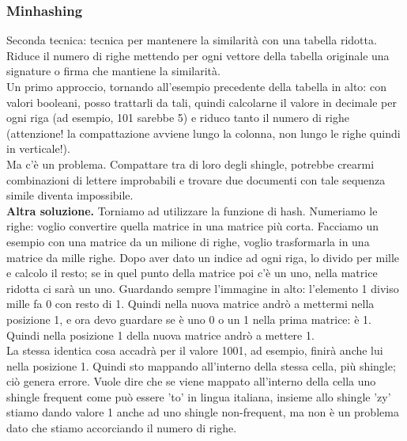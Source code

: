 \subsubsection{Minhashing}
Seconda tecnica: tecnica per mantenere la similarità con una tabella ridotta. Riduce il numero di righe mettendo per ogni vettore della tabella originale una signature o firma che mantiene la similarità. 
\\
Un primo approccio, tornando all'esempio precedente della tabella in alto: con valori booleani, posso trattarli da tali, quindi calcolarne il valore in decimale per ogni riga (ad esempio, 101 sarebbe 5) e riduco tanto il numero di righe (attenzione! la compattazione avviene lungo la colonna, non lungo le righe quindi in verticale!).
\\
Ma c'è un problema. Compattare tra di loro degli shingle, potrebbe crearmi combinazioni di lettere improbabili e trovare due documenti con tale sequenza simile diventa impossibile.
\\
\textbf{Altra soluzione.} Torniamo ad utilizzare la funzione di hash. Numeriamo le righe: voglio convertire quella matrice in una matrice più corta. Facciamo un esempio con una matrice da un milione di righe, voglio trasformarla in una matrice da mille righe. Dopo aver dato un indice ad ogni riga, lo divido per mille e calcolo il resto; se in quel punto della matrice poi c'è un uno, nella matrice ridotta ci sarà un uno. Guardando sempre l'immagine in alto: l'elemento 1 diviso mille fa 0 con resto di 1. Quindi nella nuova matrice andrò a mettermi nella posizione 1, e ora devo guardare se è uno 0 o un 1 nella prima matrice: è 1. Quindi nella posizione 1 della nuova matrice andrò a mettere 1. 
\\
La stessa identica cosa accadrà per il valore 1001, ad esempio, finirà anche lui nella posizione 1. Quindi sto mappando all'interno della stessa cella, più shingle; ciò genera errore. Vuole dire che se viene mappato all'interno della cella uno shingle frequent come può essere 'to' in lingua italiana, insieme allo shingle 'zy' stiamo dando valore 1 anche ad uno shingle non-frequent, ma non è un problema dato che stiamo accorciando il numero di righe.

\newpage


